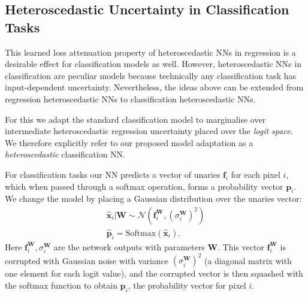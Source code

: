 \documentclass{article}
\newcommand{\softmax}{\text{Softmax}}
\newcommand{\N}{\mathcal{N}}
\newcommand{\f}{\mathbf{f}}
\newcommand{\x}{\mathbf{x}}
\newcommand{\W}{\mathbf{W}}
\newcommand{\p}{\mathbf{p}}
\begin{document}
\subsection{Heteroscedastic Uncertainty in Classification Tasks}

This learned loss attenuation property of heteroscedastic NNs in regression is a desirable effect for classification models as well. 
However, heteroscedastic NNs in classification are peculiar models because technically any classification task has input-dependent uncertainty. Nevertheless, the ideas above can be extended from regression heteroscedastic NNs to classification heteroscedastic NNs.

For this we adapt the standard classification model to marginalise over intermediate heteroscedastic regression uncertainty placed over the \textit{logit space}.
We therefore explicitly refer to our proposed model adaptation as a \textit{heteroscedastic} classification NN. 

For classification tasks our NN predicts a vector of unaries $\f_i$ for each pixel $i$, which when passed through a softmax operation, forms a probability vector $\p_i$. We change the model by placing a Gaussian distribution over the unaries vector:
\begin{equation}
\begin{split}
\hat{\x}_i | \W \sim \N(\f^\W_i, (\sigma_i^\W)^2)
\\
\hat{\p}_i = \softmax(\hat{\x}_i).
\end{split}
\end{equation}
Here $\f^\W_i, \sigma_i^\W$ are the network outputs with parameters $\W$. This vector $\f^\W_i$ is corrupted with Gaussian noise with variance $(\sigma_i^\W)^2$ (a diagonal matrix with one element for each logit value), and the corrupted vector is then squashed with the softmax function to obtain $\p_i$, the probability vector for pixel $i$.
\end{document}

